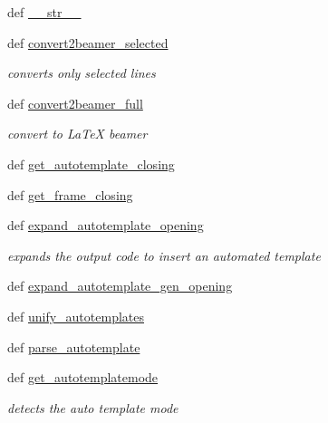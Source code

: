 \begin{DoxyCompactItemize}
\item 
def \hyperlink{classuicilibris_1_1w2beamer_1_1wiki2_ac99f478c1af50144e1c1c004ab9ff659}{\-\_\-\-\_\-str\-\_\-\-\_\-}
\item 
def \hyperlink{classuicilibris_1_1w2beamer_1_1wiki2_a3324e41bbdda1afe28ce5f27689ccaa8}{convert2beamer\-\_\-selected}
\begin{DoxyCompactList}\small\item\em converts only selected lines \end{DoxyCompactList}\item 
def \hyperlink{classuicilibris_1_1w2beamer_1_1wiki2_a3335751f0851f20ac4105204029a9808}{convert2beamer\-\_\-full}
\begin{DoxyCompactList}\small\item\em convert to \-La\-Te\-X beamer \end{DoxyCompactList}\item 
def \hyperlink{classuicilibris_1_1w2beamer_1_1wiki2_a592c26c487db6799f617db81b0466005}{get\-\_\-autotemplate\-\_\-closing}
\item 
def \hyperlink{classuicilibris_1_1w2beamer_1_1wiki2_ab1f64fca38fa5812febde88049e4f9c7}{get\-\_\-frame\-\_\-closing}
\item 
def \hyperlink{classuicilibris_1_1w2beamer_1_1wiki2_acbab4fd2162a8e7a204e00f235893b50}{expand\-\_\-autotemplate\-\_\-opening}
\begin{DoxyCompactList}\small\item\em expands the output code to insert an automated template \end{DoxyCompactList}\item 
def \hyperlink{classuicilibris_1_1w2beamer_1_1wiki2_a31de2fe8c2ec727221fc0db6f7d1c612}{expand\-\_\-autotemplate\-\_\-gen\-\_\-opening}
\item 
def \hyperlink{classuicilibris_1_1w2beamer_1_1wiki2_a1e0b672398214778819169565f21df83}{unify\-\_\-autotemplates}
\item 
def \hyperlink{classuicilibris_1_1w2beamer_1_1wiki2_abc1901a575f216a1427281132078cd7f}{parse\-\_\-autotemplate}
\item 
def \hyperlink{classuicilibris_1_1w2beamer_1_1wiki2_aeeae8754f221fcdaa0031a3ebd29f4ca}{get\-\_\-autotemplatemode}
\begin{DoxyCompactList}\small\item\em detects the auto template mode \end{DoxyCompactList}\item 

\end{DoxyCompactItemize}
